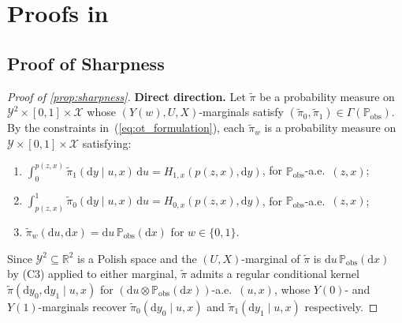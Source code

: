 \section{Proofs in \protect{}}\label{app:proofs_pid}

\subsection{Proof of Sharpness}

\begin{proof}[Proof of \cref{prop:sharpness}]
    \noindent\textbf{Direct direction.}
    Let $\tilde{\pi}$ be a probability measure on $\mathcal{Y}^2 \times [0,1] \times \mathcal{X}$ whose $(Y(w), U, X)$-marginals satisfy $(\tilde{\pi}_0,\tilde{\pi}_1) \in \Gamma(\mathbb{P}_{\text{obs}})$. By the constraints in~(\ref{eq:ot_formulation}), each $\tilde{\pi}_w$ is a probability measure on $\mathcal{Y} \times [0,1] \times \mathcal{X}$ satisfying:
    \begin{enumerate}
        \item[(C1)] $\displaystyle \int_0^{p(z,x)} \tilde{\pi}_1(\mathrm{d}y \mid u, x) \, \mathrm{d}u = H_{1,x}(p(z,x),\mathrm{d}y)$, for $\mathbb{P}_{\text{obs}}$-a.e.\ $(z,x)$;
        \item[(C2)] $\displaystyle \int_{p(z,x)}^{1} \tilde{\pi}_0(\mathrm{d}y \mid u, x) \, \mathrm{d}u = H_{0,x}(p(z,x),\mathrm{d}y)$, for $\mathbb{P}_{\text{obs}}$-a.e.\ $(z,x)$;
        \item[(C3)] $\tilde{\pi}_w(\mathrm{d}u, \mathrm{d}x) = \mathrm{d}u \, \mathbb{P}_{\text{obs}}(\mathrm{d}x)$ for $w \in \{0,1\}$.
    \end{enumerate}
    Since $\mathcal{Y}^2 \subseteq \mathbb{R}^2$ is a Polish space and the $(U, X)$-marginal of $\tilde{\pi}$ is $\mathrm{d}u \, \mathbb{P}_{\text{obs}}(\mathrm{d}x)$ by (C3) applied to either marginal, $\tilde{\pi}$ admits a regular conditional kernel $\tilde{\pi}(\mathrm{d}y_0, \mathrm{d}y_1 \mid u, x)$ for $(\mathrm{d}u \otimes \mathbb{P}_{\text{obs}}(\mathrm{d}x))$-a.e.\ $(u, x)$, whose $Y(0)$- and $Y(1)$-marginals recover $\tilde{\pi}_0(\mathrm{d}y_0 \mid u, x)$ and $\tilde{\pi}_1(\mathrm{d}y_1 \mid u, x)$ respectively.


\end{proof}
